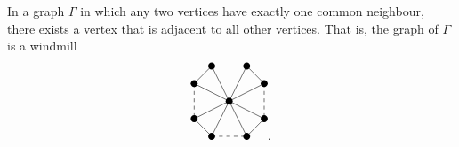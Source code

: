 \begin{theorem}
In a graph $ \Gamma $ in which any two vertices have exactly one common neighbour, there exists a vertex that is adjacent to all other vertices. That is, the graph of $ \Gamma $ is a windmill
$$
\begin{tikzpicture}
\fill (0, 0) circle (0.1);
\fill (-0.5, 1) circle (0.1);
\fill (0.5, 1) circle (0.1);
\fill (-1, 0.5) circle (0.1);
\fill (1, 0.5) circle (0.1);
\fill (-1, -0.5) circle (0.1);
\fill (1, -0.5) circle (0.1);
\fill (-0.5, -1) circle (0.1);
\fill (0.5, -1) circle (0.1);
\draw (0, 0) to (-0.5, 1);
\draw (0, 0) to (0.5, 1);
\draw (0, 0) to (-1, 0.5);
\draw (0, 0) to (1, 0.5);
\draw (0, 0) to (-1, -0.5);
\draw (0, 0) to (1, -0.5);
\draw (0, 0) to (-0.5, -1);
\draw (0, 0) to (0.5, -1);
\draw [dashed] (-0.5, 1) to (0.5, 1);
\draw (-0.5, 1) to (-1, 0.5);
\draw (0.5, 1) to (1, 0.5);
\draw [dashed] (-1, 0.5) to (-1, -0.5);
\draw [dashed] (1, 0.5) to (1, -0.5);
\draw (-1, -0.5) to (-0.5, -1);
\draw (1, -0.5) to (0.5, -1);
\draw [dashed] (-0.5, -1) to (0.5, -1);
\end{tikzpicture}.
$$
\end{theorem}

